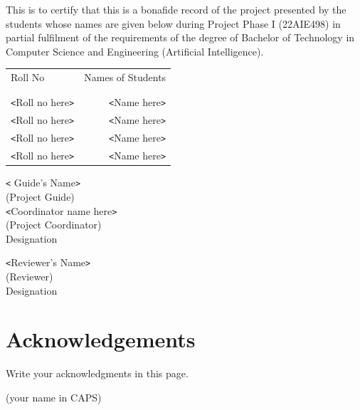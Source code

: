 \documentclass[a4paper, 12pt]{report}
\theoremstyle{definition}
\begin{document}
	\vspace*{.8cm}
	This is to certify that this is a bonafide record of the project presented by the students whose names are given below during Project Phase I (22AIE498) in partial fulfilment of the requirements of the degree of Bachelor of Technology in Computer Science and Engineering (Artificial Intelligence).\\[1.0cm]

\begin{table}[h]
\centering
\begin{tabular}{lr}
Roll No & Names of Students \\ \\ \hline
\\
\texttt{<}Roll no here\texttt{>} & \texttt{<}Name here\texttt{>} \\
\texttt{<}Roll no here\texttt{>} & \texttt{<}Name here\texttt{>} \\
\texttt{<}Roll no here\texttt{>} & \texttt{<}Name here\texttt{>} \\
\texttt{<}Roll no here\texttt{>} & \texttt{<}Name here\texttt{>} \\
\end{tabular}
\end{table}

\begin{flushleft}
  \texttt{<} Guide's Name\texttt{>}\\
(Project Guide)\\  [1cm]

 \texttt{<}Coordinator name here\texttt{>}\\
(Project Coordinator)\\
Designation\\
\end{flushleft}
\begin{flushright}
\texttt{<}Reviewer's Name\texttt{>}\\
(Reviewer)\\
Designation
\end{flushright}

\newpage
	\clearpage
	\tableofcontents

	\chapter*{Acknowledgements}
	Write your acknowledgments in this page.\\
	\vspace{1cm}
	\begin{flushright}
		(your name in CAPS)
	\end{flushright}
	\listoffigures
	\listoftables
	\newpage

\end{document}

